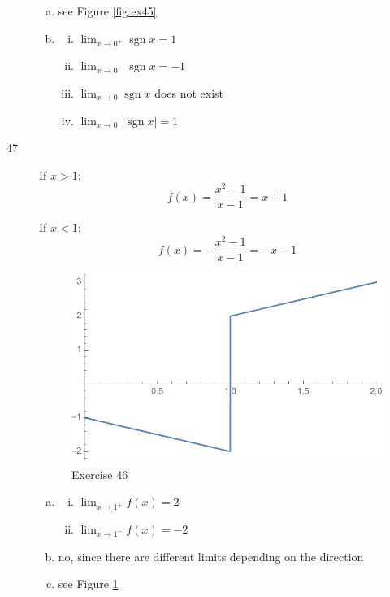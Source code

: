 \documentclass[letterpaper]{exam}
\newcommand{\sgn}{\operatorname{sgn}}
\begin{document}
\begin{description}
        \begin{enumerate}[(a)]
          \item see Figure \ref{fig:ex45}
          \item
            \begin{enumerate}[(i)]
              \item $\lim_{x \to 0^+} \sgn x = \boxed{ 1 }$
              \item $\lim_{x \to 0^-} \sgn x = \boxed{ -1 }$
              \item $\lim_{x \to 0} \sgn x$ does not exist
              \item $\lim_{x \to 0} |\sgn x| = 1$
            \end{enumerate}
        \end{enumerate}

      \item[47]
        If $x > 1$:
        \[
          f(x) = \frac{x^2 - 1}{x - 1} = x + 1
        \]

        If $x < 1$:
        \[
          f(x) = - \frac{x^2 - 1}{x - 1} = -x - 1
        \]

        \begin{figure}[H]
          \centering
          \includegraphics[scale = 0.5]{ex46.pdf}
          \caption{Exercise 46}
          \label{fig:ex46}
        \end{figure}

        \begin{enumerate}[(a)]
          \item
            \begin{enumerate}[(i)]
              \item $\lim_{x \to 1^+} f(x) = \boxed{ 2 }$
              \item $\lim_{x \to 1^-} f(x) = \boxed{ -2 }$
            \end{enumerate}
          \item no, since there are different limits depending on the direction
          \item see Figure \ref{fig:ex46}
        \end{enumerate}


\end{description}
\end{document}
